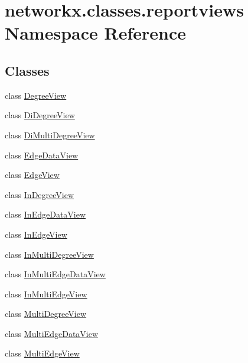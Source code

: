 \hypertarget{namespacenetworkx_1_1classes_1_1reportviews}{}\section{networkx.\+classes.\+reportviews Namespace Reference}
\label{namespacenetworkx_1_1classes_1_1reportviews}
\subsection*{Classes}
\begin{DoxyCompactItemize}
\item 
class \hyperlink{classnetworkx_1_1classes_1_1reportviews_1_1DegreeView}{Degree\+View}
\item 
class \hyperlink{classnetworkx_1_1classes_1_1reportviews_1_1DiDegreeView}{Di\+Degree\+View}
\item 
class \hyperlink{classnetworkx_1_1classes_1_1reportviews_1_1DiMultiDegreeView}{Di\+Multi\+Degree\+View}
\item 
class \hyperlink{classnetworkx_1_1classes_1_1reportviews_1_1EdgeDataView}{Edge\+Data\+View}
\item 
class \hyperlink{classnetworkx_1_1classes_1_1reportviews_1_1EdgeView}{Edge\+View}
\item 
class \hyperlink{classnetworkx_1_1classes_1_1reportviews_1_1InDegreeView}{In\+Degree\+View}
\item 
class \hyperlink{classnetworkx_1_1classes_1_1reportviews_1_1InEdgeDataView}{In\+Edge\+Data\+View}
\item 
class \hyperlink{classnetworkx_1_1classes_1_1reportviews_1_1InEdgeView}{In\+Edge\+View}
\item 
class \hyperlink{classnetworkx_1_1classes_1_1reportviews_1_1InMultiDegreeView}{In\+Multi\+Degree\+View}
\item 
class \hyperlink{classnetworkx_1_1classes_1_1reportviews_1_1InMultiEdgeDataView}{In\+Multi\+Edge\+Data\+View}
\item 
class \hyperlink{classnetworkx_1_1classes_1_1reportviews_1_1InMultiEdgeView}{In\+Multi\+Edge\+View}
\item 
class \hyperlink{classnetworkx_1_1classes_1_1reportviews_1_1MultiDegreeView}{Multi\+Degree\+View}
\item 
class \hyperlink{classnetworkx_1_1classes_1_1reportviews_1_1MultiEdgeDataView}{Multi\+Edge\+Data\+View}
\item 
class \hyperlink{classnetworkx_1_1classes_1_1reportviews_1_1MultiEdgeView}{Multi\+Edge\+View}

\end{DoxyCompactItemize}

